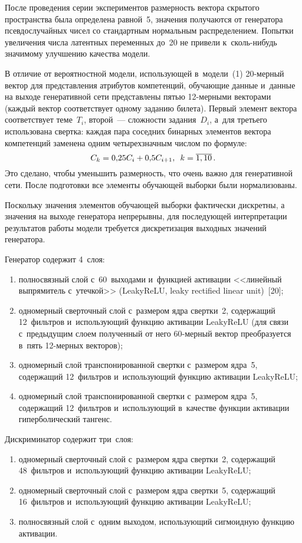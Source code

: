 \begin{multicols}{2}
  После проведения серии экспериментов раз\-мер\-ность вектора скрытого 
пространства была определена равной~5, значения получаются от генератора 
псевдослучайных чисел со стандартным нормальным распределением. 
Попытки увеличения числа латентных переменных до~20 не привели 
к~сколь-ни\-будь значимому улучшению качества модели.
  
  В отличие от вероятностной модели, ис\-поль\-зу\-ющей в~модели~(1)  
20-мер\-ный вектор для пред\-став\-ле\-ния атрибутов компетенций, обучающие 
данные и~данные на выходе генеративной сети пред\-став\-ле\-ны пятью  
12-мер\-ны\-ми векторами (каждый вектор соответствует одному заданию 
билета). Первый элемент вектора соответствует теме~$T_i$, второй~--- 
сложности задания~$D_i$, а~для третьего использована свертка: каждая пара 
соседних бинарных элементов вектора компетенций заменена одним 
четырехзначным числом по формуле:
$$
C_k= 0{,}25C_i+  0{,}5C_{i+1},\enskip k= \overline{1,10}\,.
$$
 Это сделано, чтобы уменьшить 
размерность, что очень важно для генеративной сети. После подготовки все 
элементы обучающей выборки были нормализованы.
  
  Поскольку значения элементов обуча\-ющей выборки фактически 
дискретны, а значения на выходе генератора непрерывны, для последующей 
интерпретации результатов работы модели требуется дискретизация 
выходных значений генератора.
  
  Генератор содержит 4~слоя:
  \begin{enumerate}[(1)]
\item полносвязный слой с~60~выходами и~функцией активации <<линейный 
выпрямитель с~утечкой>> (LeakyReLU, leaky rectified linear unit)~[20];
\item одномерный сверточный слой с~размером ядра свертки~2, содержащий 
12~фильт\-ров и~использующий функцию активации LeakyReLU (для связи 
с~предыдущим слоем полученный от него 60-мер\-ный вектор преобразуется 
в~пять 12-мер\-ных векторов);
\item одномерный слой транспонированной свертки с~размером 
ядра~5, содержащий 12~фильт\-ров и~использующий функцию 
активации LeakyReLU;
\item одномерный слой транспонированной свертки с~размером ядра~5, 
содержащий 12~фильтров и~использующий в~качестве функции активации 
гиперболический тангенс.
\end{enumerate}

  Дискриминатор содержит три~слоя:
\begin{enumerate}[(1)]
\item одномерный сверточный слой с~размером ядра свертки~2, содержащий 
48~фильтров и~использующий функцию активации LeakyReLU;
\item одномерный сверточный слой с~размером ядра свертки~5, содержащий 
16~фильт\-ров и~использующий функцию активации LeakyReLU;
\item полносвязный слой с~одним выходом, использующий сигмоидную 
функцию активации.
\end{enumerate}


\end{multicols}
